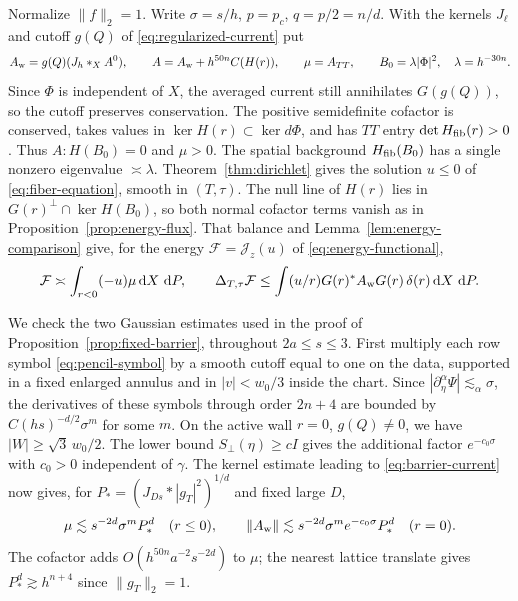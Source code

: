 Normalize $\|f\|_2=1$. Write $\sigma=s/h$, $p=p_c$, $q=p/2=n/d$. With
the kernels $J_\ell$ and cutoff $g(Q)$ of \eqref{eq:regularized-current} put
\[
 A_{\rm w}=g(Q)(J_h*_X A^0),\qquad A=A_{\rm w}+h^{50n}C(H(r)),\qquad
 \mu=A_{TT},\qquad B_0=\lambda|\Phi|^2,\quad \lambda=h^{-30n}.
\]
Since $\Phi$ is independent of $X$, the averaged current still annihilates
$G(g(Q))$, so the cutoff preserves conservation. The positive semidefinite
cofactor is conserved, takes values in $\ker H(r)\subset\ker d\Phi$, and has
$TT$ entry $\det H_{\rm fib}(r)>0$. Thus $A:H(B_0)=0$ and $\mu>0$.
The spatial background $H_{\rm fib}(B_0)$ has a single nonzero eigenvalue
$\asymp\lambda$. Theorem~\ref{thm:dirichlet} gives the solution
$u\le0$ of \eqref{eq:fiber-equation}, smooth in $(T,\tau)$. The null
line of $H(r)$ lies in $G(r)^\perp\cap\ker H(B_0)$, so both normal
cofactor terms vanish as in Proposition~\ref{prop:energy-flux}. That
balance and Lemma~\ref{lem:energy-comparison} give, for the energy
$\mathcal F=\mathcal J_z(u)$ of \eqref{eq:energy-functional},
\begin{equation}\label{eq:pencil-energy}
 \mathcal F\asymp\int_{r<0}(-u)\mu\,\mathrm d X\,\,\mathrm d P,\qquad
 \Delta_{T,\tau}\mathcal F
 \le\int (u/r)G(r)^*A_{\rm w}G(r)\,\delta(r)\,\mathrm d X\,\,\mathrm d P .
\end{equation}

We check the two Gaussian estimates used in the proof of
Proposition~\ref{prop:fixed-barrier}, throughout $2a\le s\le3$.
First multiply each row symbol \eqref{eq:pencil-symbol} by a smooth
cutoff equal to one on the data, supported in a fixed enlarged annulus
and in $|v|<w_0/3$ inside the chart. Since $|\partial_\eta^\alpha\Psi|\lesssim_\alpha\sigma$,
the derivatives of these symbols through order $2n+4$ are bounded by
$C(hs)^{-d/2}\sigma^m$ for some $m$. On the active wall
$r=0$, $g(Q)\ne0$, we have $|W|\ge\sqrt3\,w_0/2$. The lower bound
$S_\perp(\eta)\ge cI$ gives the additional factor $e^{-c_0\sigma}$ with
$c_0>0$ independent of $\gamma$. The kernel estimate leading to
\eqref{eq:barrier-current} now gives, for $P_*=(J_{Ds}*|g_T|^2)^{1/d}$
and fixed large $D$,
\begin{equation}\label{eq:pencil-envelope}
 \mu\lesssim s^{-2d}\sigma^m P_*^d \quad(r\le0),\qquad
 \|A_{\rm w}\|\lesssim s^{-2d}\sigma^m e^{-c_0\sigma}P_*^d\quad(r=0).
\end{equation}
The cofactor adds $O(h^{50n}a^{-2}s^{-2d})$ to $\mu$;
the nearest lattice translate gives $P_*^d\gtrsim h^{n+4}$ since $\|g_T\|_2=1$.

